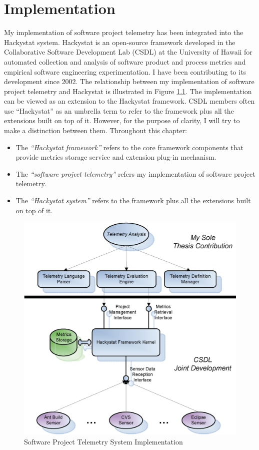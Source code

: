 \chapter{Implementation}  \label{Chapter:Implementation}

My implementation of software project telemetry has been integrated into the Hackystat system. Hackystat is an open-source framework developed in the Collaborative Software Development Lab (CSDL) at the University of Hawaii for automated collection and analysis of software product and process metrics and empirical software engineering experimentation. I have been contributing to its development since 2002. The relationship between my implementation of software project telemetry and Hackystat is illustrated in Figure \ref{fig:TelemetryImplementation}.
The implementation can be viewed as an extension to the Hackystat framework. CSDL members often use ``Hackystat'' as an umbrella term to refer to the framework plus all the extensions built on top of it. However, for the purpose of clarity, I will try to make a distinction between them. Throughout this chapter:

\begin{itemize}
	\item The \textit{``Hackystat framework''} refers to the core framework components that provide metrics storage service and extension plug-in mechanism.
	\item The \textit{``software project telemetry''} refers my implementation of software project telemetry.
	\item The \textit{``Hackystat system''} refers to the framework plus all the extensions built on top of it.
\end{itemize}

\begin{figure}[p]
  \includegraphics[width=1.00\textwidth]{figures/TelemetryImplementation}
  \caption{Software Project Telemetry System Implementation} 
  \label{fig:TelemetryImplementation}
\end{figure}

